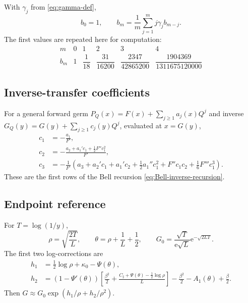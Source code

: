 \documentclass[11pt,oneside]{article}
\numberwithin{equation}{section}
\theoremstyle{definition}
\theoremstyle{remark}
\newcommand{\e}{\mathrm e}
\begin{document}
With $\gamma_j$ from \eqref{eq:gamma-def},
\begin{equation}
 b_0=1,
 \qquad
 b_m=\frac1m\sum_{j=1}^{m}j\gamma_jb_{m-j}.
 \label{eq:b-reference-rec}
\end{equation}
The first values are repeated here for computation:
\begin{equation}
 \begin{array}{c|ccccc}
 m&0&1&2&3&4\\ \hline
 b_m&1&\dfrac1{18}&\dfrac{31}{16200}&
 \dfrac{2347}{42865200}&\dfrac{1904369}{1311675120000}
 \end{array}
 \label{eq:b-reference-table}
\end{equation}

\subsection{Inverse-transfer coefficients}

For a general forward germ
$P_Q(x)=F(x)+\sum_{j\ge1}a_j(x)Q^j$ and inverse
$G_Q(y)=G(y)+\sum_{j\ge1}c_j(y)Q^j$, evaluated at $x=G(y)$,
\begin{align}
 c_1&=-\frac{a_1}{F'},
 \label{eq:c1-general-ref}\\
 c_2&=-\frac{a_2+a_1'c_1+\tfrac12F''c_1^2}{F'},
 \label{eq:c2-general-ref}\\
 c_3&=-\frac{1}{F'}\left(
 a_3+a_2'c_1+a_1'c_2+\frac12a_1''c_1^2
 +F''c_1c_2+\frac16F'''c_1^3\right).
 \label{eq:c3-general-ref}
\end{align}
These are the first rows of the Bell recursion \eqref{eq:Bell-inverse-recursion}.

\subsection{Endpoint reference}

For $T=\log(1/y)$,
\begin{equation}
 \rho=\sqrt{\frac{2T}{L}},
 \qquad
 \theta=\rho+\frac1L+\frac12,
 \qquad
 G_0=\frac{\sqrt T}{\e\sqrt L}\e^{-\sqrt{2LT}}.
 \label{eq:endpoint-reference-vars}
\end{equation}
The first two log-corrections are
\begin{align}
 h_1&=\frac12\log\rho+\kappa_0-\Psi(\theta),
 \label{eq:h1-reference}\\
 h_2&=(1-\Psi'(\theta))
 \left[\frac{\beta^2}{2}+\frac{C_{\sharp}+\Psi(\theta)-\tfrac12\log\rho}{L}\right]
 -\frac{\beta^2}{2}-A_1(\theta)+\frac\beta2.
 \label{eq:h2-reference}
\end{align}
Then $G\approx G_0\exp(h_1/\rho+h_2/\rho^2)$.
\end{document}
